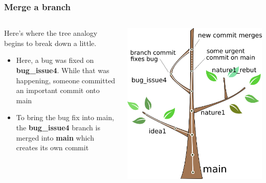 \documentclass{beamer}
\begin{document}
\begin{frame}
  \frametitle{Merge a branch}
  \begin{columns}[T]
    \begin{column}{.5\textwidth}
      Here's where the tree analogy begins to break down a little.
      \begin{itemize}
      \item Here, a bug was fixed on \textbf{bug\_issue4}. While that was
        happening, someone committed an important commit onto main
      \item To bring the bug fix into main, the \textbf{bug\_issue4}
        branch is \alert{merged} into \textbf{main} which creates its own
        commit
      \end{itemize}
    \end{column}
    \begin{column}{.5\textwidth}
      \includegraphics[width=\textwidth]{tree_merge.png}
    \end{column}
  \end{columns}
\end{frame}
\end{document}
